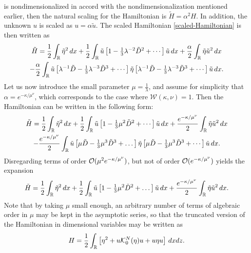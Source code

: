is nondimensionalized in accord with the nondimensionalization
mentioned earlier, then the natural scaling for the Hamiltonian is
$ \tilde{H}= \alpha^2 H$. In addition, the unknown $u$ is scaled as $u = \alpha \tilde{u}$. The
scaled Hamiltonian \eqref{scaled-Hamiltonian} is then written as
%
\begin{multline*}
	\tilde{H} = \frac{1}{2} \int_{\mathbb{R}} \tilde{\eta}^2 \, dx
 + \frac{1}{2} \int_{\mathbb{R}} \tilde{u} \left[ 1 - {\textstyle{\frac{1}{3}}} \lambda^{-2} \tilde{D}^2 + \cdots \right] \tilde{u} \, dx  
 + \frac{\alpha}{2} \int_{\mathbb{R}}  \tilde{\eta}  \tilde{u}^2 \, dx
\\
 - \frac{\alpha}{2} \int_{\mathbb{R}}  \tilde{u} \left[ \lambda^{-1} \tilde{D} - {\textstyle{\frac{1}{3}}} \lambda^{-3}\tilde{D}^3 +  \cdots \right] \tilde{\eta} 
   \left[ \lambda^{-1} \tilde{D} - {\textstyle{\frac{1}{3}}} \lambda^{-3}\tilde{D}^3 + \cdots \right] \tilde{u} \, dx.
\end{multline*}
%
Let us now introduce the small parameter $\mu= \frac{1}{\lambda}$,
and assume for simplicity that $\alpha = e^{- \kappa / \mu^\nu}$, which corresponds to the
case where $\mathcal{W}(\kappa,\nu) = 1$. 
Then the Hamiltonian can be written in the following form:
%
\begin{multline*}
\tilde{H} = \frac{1}{2} \int_{\mathbb{R}} \tilde{\eta}^2 \, dx
        + \frac{1}{2} \int_{\mathbb{R}} \tilde{u} \left[ 1 - {\textstyle{\frac{1}{3}}} \mu^{2} \tilde{D}^2 + \cdots \right] \tilde{u} \, dx  
+ \frac{e^{-\kappa/\mu^\nu}}{2} \int_{\mathbb{R}}  \tilde{\eta}  \tilde{u}^2 \, dx
\\
- \frac{e^{-\kappa/\mu^\nu}}{2} \int_{\mathbb{R}}  \tilde{u} \left[ \mu \tilde{D} - {\textstyle{\frac{1}{3}}} \mu^{3}\tilde{D}^3 +  \dots\right]
                      \tilde{\eta} \left[ \mu \tilde{D} - {\textstyle{\frac{1}{3}}} \mu^{3}\tilde{D}^3 + \cdots \right] \tilde{u} \, dx.
\end{multline*}
%
Disregarding terms of order ${\mathcal{O}}(\mu^2 e^{-\kappa/\mu^\nu})$, but not of order
${\mathcal{O}}(e^{-\kappa/\mu^\nu})$ yields the expansion
\begin{equation}
\tilde{H} = \frac{1}{2} \int_{\mathbb{R}} \tilde{\eta}^2 \, dx 
    + \frac{1}{2} \int_{\mathbb{R}} \tilde{u} \left[ 1 - {\textstyle{\frac{1}{3}}} \mu^{2} \tilde{D}^2 + \dots \right] \tilde{u} \, dx  
    + \frac{e^{-\kappa/\mu^\nu}}{2} \int_{\mathbb{R}}  \tilde{\eta}  \tilde{u}^2 \, dx.   
\end{equation}
%
Note that by taking $\mu$ small enough, an arbitrary number of terms of algebraic order 
in $\mu$ may be kept in the asymptotic series, 
so that the truncated version of the Hamiltonian in dimensional 
variables may be written as
%
\begin{equation}\label{Hamiltonian-eta-u-truncated}
	H   = \frac{1}{2} \int_{\mathbb{R}} \left[ \eta^2 + u \mathcal{K}_0^N (\eta) u + u \eta u \right] \, dx dz.
\end{equation}
